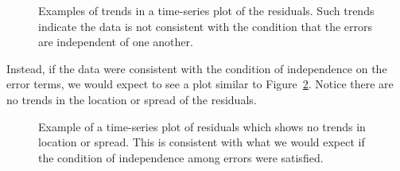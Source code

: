 \documentclass[
  letterpaper,
  DIV=11,
  numbers=noendperiod]{scrreprt}
\theoremstyle{definition}
\theoremstyle{definition}
\theoremstyle{plain}
\theoremstyle{remark}
\begin{document}
\begin{figure}


\caption{\label{fig-regassessment-independence-violations}Examples of
trends in a time-series plot of the residuals. Such trends indicate the
data is not consistent with the condition that the errors are
independent of one another.}

\end{figure}%

Instead, if the data were consistent with the condition of independence
on the error terms, we would expect to see a plot similar to
Figure~\ref{fig-regassessment-independence-reasonable}. Notice there are
no trends in the location or spread of the residuals.

\begin{figure}


\caption{\label{fig-regassessment-independence-reasonable}Example of a
time-series plot of residuals which shows no trends in location or
spread. This is consistent with what we would expect if the condition of
independence among errors were satisfied.}

\end{figure}%
\end{document}
